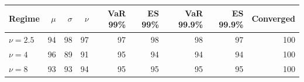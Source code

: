 \begin{tabular}{lrrrrrrrr}
\toprule
Regime & $\mu$ & $\sigma$ & $\nu$ & VaR 99\% & ES 99\% & VaR 99.9\% & ES 99.9\% & Converged \\
\midrule
$\nu = 2.5$ & 94 & 98 & 97 & 97 & 98 & 98 & 97 & 100 \\
$\nu = 4$ & 96 & 89 & 91 & 95 & 94 & 94 & 94 & 100 \\
$\nu = 8$ & 93 & 93 & 94 & 95 & 95 & 95 & 95 & 100 \\
\bottomrule
\end{tabular}

